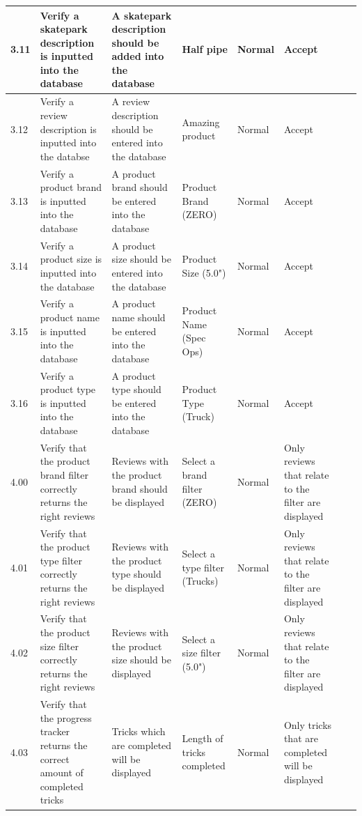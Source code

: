 \begin{landscape}
\begin{center}
\begin{longtable}{|p{1.5cm}|p{2.5cm}|p{2.5cm}|p{2cm}|p{2cm}|p{2cm}|p{2cm}|p{2cm}|}
3.11 & Verify a skatepark description is inputted into the database & A skatepark description should be added into the database & Half pipe & Normal & Accept & & \\ \hline

3.12 & Verify a review description is inputted into the databse & A review description should be entered into the database & Amazing product & Normal & Accept & & \\ \hline
 
3.13 & Verify a product brand is inputted into the database & A product brand should be entered into the database & Product Brand (ZERO) & Normal & Accept & & \\ \hline

3.14 & Verify a product size is inputted into the database & A product size should be entered into the database & Product Size (5.0") & Normal & Accept && \\ \hline

3.15 & Verify a product name is inputted into the database & A product name should be entered into the database & Product Name (Spec Ops) & Normal & Accept & & \\ \hline

3.16 & Verify a product type is inputted into the database & A product type should be entered into the database & Product Type (Truck) & Normal & Accept & & \\ \hline



4.00 & Verify that the product brand filter correctly returns the right reviews & Reviews with the product brand should be displayed & Select a brand filter (ZERO) & Normal & Only reviews that relate to the filter are displayed & & \\ \hline

4.01 & Verify that the product type filter correctly returns the right reviews & Reviews with the product type should be displayed & Select a type filter (Trucks) & Normal & Only reviews that relate to the filter are displayed & & \\ \hline

4.02 & Verify that the product size filter correctly returns the right reviews & Reviews with the product size should be displayed & Select a size filter (5.0") & Normal & Only reviews that relate to the filter are displayed & & \\ \hline

4.03 & Verify that the progress tracker returns the correct amount of completed tricks & Tricks which are completed will be displayed & Length of tricks completed & Normal & Only tricks that are completed will be displayed & & \\ \hline


\end{longtable}
\end{center}
\end{landscape}
